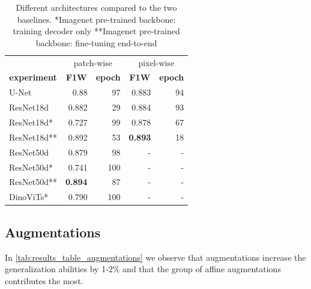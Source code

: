 \documentclass[10pt,conference,compsocconf]{IEEEtran}
\begin{document}
\begin{table}[ht!]
    \centering
    \begin{tabular}{l|rr|rr}
        \toprule
        \multicolumn{1}{c}{} &
        \multicolumn{2}{c}{patch-wise} &
        \multicolumn{2}{c}{pixel-wise} \\
        \multicolumn{1}{c}{\textbf{experiment}} &
        \multicolumn{1}{c}{\textbf{F1W}} &
        \multicolumn{1}{c}{\textbf{epoch}} &
        \multicolumn{1}{c}{\textbf{F1W}} &
        \multicolumn{1}{c}{\textbf{epoch}} \\
        \midrule
            U-Net        & 0.88 & 97 & 0.883 & 94 \\
            ResNet18d   & 0.882 & 29 & 0.884 & 93 \\
            ResNet18d*  & 0.727 & 99 & 0.878 & 67 \\
            ResNet18d** & 0.892 & 53 & \textbf{0.893} & 18 \\
            ResNet50d   & 0.879 & 98 & - & - \\
            ResNet50d*  & 0.741 & 100 & - & - \\
            ResNet50d** & \textbf{0.894} & 87 & - & - \\
            DinoViTs*   & 0.790 & 100 & - & - \\
        \bottomrule
    \end{tabular}
    \caption{Different architectures compared to the two baselines. 
    *Imagenet pre-trained backbone: training decoder only  
    **Imagenet pre-trained backbone: fine-tuning end-to-end}
    \label{tab:results_table_architectures}
\end{table}

\subsection{Augmentations}
In \autoref{tab:results_table_augmentations} we observe that augmentations increase the generalization abilities by 1-2\% and that the group of affine augmentations contributes the most.
\end{document}
